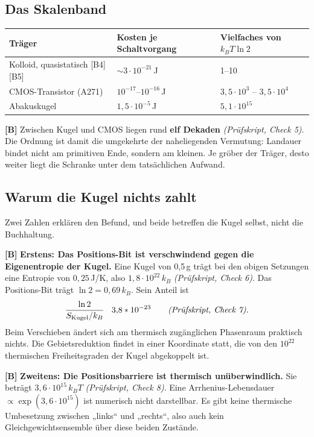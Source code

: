 \subsection{Das Skalenband}

\begin{center}
\small
\begin{tabular}{@{}lll@{}}
\toprule
\textbf{Träger} & \textbf{Kosten je Schaltvorgang} & \textbf{Vielfaches von $k_BT\ln 2$} \\
\midrule
Kolloid, quasistatisch [B4][B5] & ${\sim}3\cdot10^{-21}$\,J & 1--10 \\
CMOS-Transistor (A271) & $10^{-17}$--$10^{-16}$\,J & $3{,}5\cdot10^{3}$ -- $3{,}5\cdot10^{4}$ \\
Abakuskugel & $1{,}5\cdot10^{-5}$\,J & $5{,}1\cdot10^{15}$ \\
\bottomrule
\end{tabular}
\end{center}

\textbf{[B]} Zwischen Kugel und CMOS liegen rund \textbf{elf Dekaden} \emph{(Prüfskript, Check 5)}. Die
Ordnung ist damit die umgekehrte der naheliegenden Vermutung: Landauer bindet
nicht am primitiven Ende, sondern am kleinen. Je gröber der Träger, desto weiter
liegt die Schranke unter dem tatsächlichen Aufwand.

\subsection{Warum die Kugel nichts zahlt}

Zwei Zahlen erklären den Befund, und beide betreffen die Kugel selbst, nicht die
Buchhaltung.

\textbf{[B]} \textbf{Erstens: Das Positions-Bit ist verschwindend gegen die Eigenentropie
der Kugel.} Eine Kugel von 0,5\,g trägt bei den obigen Setzungen eine Entropie von
$0{,}25$\,J/K, also $1{,}8\cdot10^{22}\,k_B$ \emph{(Prüfskript, Check 6)}. Das Positions-Bit
trägt $\ln 2 = 0{,}69\,k_B$. Sein Anteil ist
\begin{equation}
  \frac{\ln 2}{S_{\text{Kugel}}/k_B} \;\approx\; 3{,}8\cdot10^{-23}
  \qquad \text{\emph{(Prüfskript, Check 7)}} .
\end{equation}
Beim Verschieben ändert sich am thermisch zugänglichen Phasenraum praktisch
nichts. Die Gebietsreduktion findet in einer Koordinate statt, die von den
$10^{22}$ thermischen Freiheitsgraden der Kugel abgekoppelt ist.

\textbf{[B]} \textbf{Zweitens: Die Positionsbarriere ist thermisch unüberwindlich.} Sie
beträgt $3{,}6\cdot10^{15}\,k_BT$ \emph{(Prüfskript, Check 8)}. Eine Arrhenius-Lebensdauer
$\propto \exp(3{,}6\cdot10^{15})$ ist numerisch nicht darstellbar. Es gibt keine
thermische Umbesetzung zwischen „links“ und „rechts“, also auch kein
Gleichgewichtsensemble über diese beiden Zustände.

